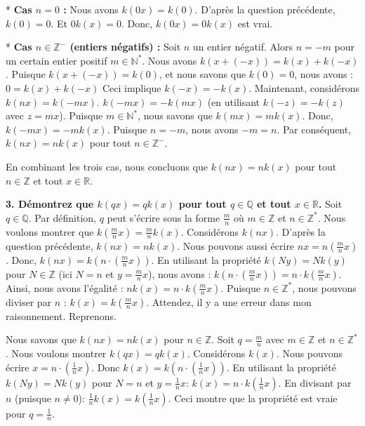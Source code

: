 \documentclass[12pt,a4paper]{report}
\begin{document}
*   \textbf{Cas $n=0$ :}
    Nous avons $k(0x) = k(0)$. D'après la question précédente, $k(0)=0$.
    Et $0k(x) = 0$.
    Donc, $k(0x) = 0k(x)$ est vrai.

*   \textbf{Cas $n \in \mathbb{Z}^-$ (entiers négatifs) :}
    Soit $n$ un entier négatif. Alors $n = -m$ pour un certain entier positif $m \in \mathbb{N}^*$.
    Nous avons $k(x+(-x)) = k(x) + k(-x)$.
    Puisque $k(x+(-x)) = k(0)$, et nous savons que $k(0)=0$, nous avons :
    $0 = k(x) + k(-x)$
    Ceci implique $k(-x) = -k(x)$.
    Maintenant, considérons $k(nx) = k(-mx)$.
    $k(-mx) = -k(mx)$ (en utilisant $k(-z)=-k(z)$ avec $z=mx$).
    Puisque $m \in \mathbb{N}^*$, nous savons que $k(mx) = mk(x)$.
    Donc, $k(-mx) = -mk(x)$.
    Puisque $n = -m$, nous avons $-m = n$.
    Par conséquent, $k(nx) = nk(x)$ pour tout $n \in \mathbb{Z}^-$.

En combinant les trois cas, nous concluons que $k(nx) = nk(x)$ pour tout $n \in \mathbb{Z}$ et tout $x \in \mathbb{R}$.

\textbf{3. Démontrez que $k(qx) = qk(x)$ pour tout $q \in \mathbb{Q}$ et tout $x \in \mathbb{R}$.}
Soit $q \in \mathbb{Q}$. Par définition, $q$ peut s'écrire sous la forme $\frac{m}{n}$ où $m \in \mathbb{Z}$ et $n \in \mathbb{Z}^*$.
Nous voulons montrer que $k\left(\frac{m}{n}x\right) = \frac{m}{n}k(x)$.
Considérons $k(nx)$. D'après la question précédente, $k(nx) = nk(x)$.
Nous pouvons aussi écrire $nx = n \left(\frac{m}{n}x\right)$.
Donc, $k(nx) = k\left(n \cdot \left(\frac{m}{n}x\right)\right)$.
En utilisant la propriété $k(Ny) = Nk(y)$ pour $N \in \mathbb{Z}$ (ici $N=n$ et $y=\frac{m}{n}x$), nous avons :
$k\left(n \cdot \left(\frac{m}{n}x\right)\right) = n \cdot k\left(\frac{m}{n}x\right)$.
Ainsi, nous avons l'égalité :
$nk(x) = n \cdot k\left(\frac{m}{n}x\right)$.
Puisque $n \in \mathbb{Z}^*$, nous pouvons diviser par $n$ :
$k(x) = k\left(\frac{m}{n}x\right)$.
Attendez, il y a une erreur dans mon raisonnement. Reprenons.

Nous savons que $k(nx) = nk(x)$ pour $n \in \mathbb{Z}$.
Soit $q = \frac{m}{n}$ avec $m \in \mathbb{Z}$ et $n \in \mathbb{Z}^*$.
Nous voulons montrer $k(qx) = qk(x)$.
Considérons $k(x)$. Nous pouvons écrire $x = n \cdot \left(\frac{1}{n}x\right)$.
Donc $k(x) = k\left(n \cdot \left(\frac{1}{n}x\right)\right)$.
En utilisant la propriété $k(Ny) = Nk(y)$ pour $N=n$ et $y=\frac{1}{n}x$:
$k(x) = n \cdot k\left(\frac{1}{n}x\right)$.
En divisant par $n$ (puisque $n \ne 0$):
$\frac{1}{n}k(x) = k\left(\frac{1}{n}x\right)$.
Ceci montre que la propriété est vraie pour $q = \frac{1}{n}$.
\end{document}
